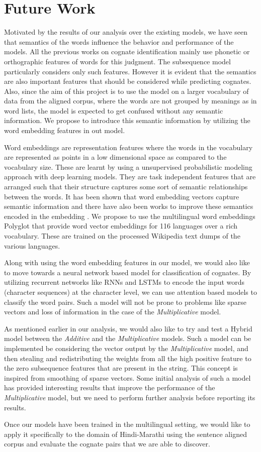 \chapter{Future Work}

Motivated by the results of our analysis over the existing models, we have seen that semantics of the words influence the behavior and performance of the models. All the previous works on cognate identification mainly use phonetic or orthographic features of words for this judgment. The subsequence model particularly considers only such features. However it is evident that the semantics are also important features that should be considered while predicting cognates. Also, since the aim of this project is to use the model on a larger vocabulary of data from the aligned corpus, where the words are not grouped by meanings as in word lists, the model is expected to get confused without any semantic information. We propose to introduce this semantic information by utilizing the word embedding features in out model. 

Word embeddings are representation features where the words in the vocabulary are represented as points in a low dimensional space as compared to the vocabulary size. These are learnt by using a unsupervised probabilistic modeling approach with deep learning models. They are task independent features that are arranged such that their structure captures some sort of semantic relationships between the words. It has been shown that word embedding vectors capture semantic information \cite{faruqui2014retrofitting} and there have also been works to improve these semantics encoded in the embedding \cite{maas2010probabilistic}. We propose to use the multilingual word embeddings Polyglot \cite{polyglot:2013:ACL-CoNLL} that provide word vector embeddings for 116 languages over a rich vocabulary. These are trained on the processed Wikipedia text dumps of the various languages. 

Along with using the word embedding features in our model, we would also like to move towards a neural network based model for classification of cognates. By utilizing recurrent networks like RNNs and LSTMs to encode the input words (character sequences) at the character level, we can use attention based models to classify the word pairs. Such a model will not be prone to problems like sparse vectors and loss of information in the case of the \textit{Multiplicative} model.

As mentioned earlier in our analysis, we would also like to try and test a Hybrid model  between the \textit{Additive} and the \textit{Multiplicative} models. Such a model can be implemented be considering the vector output by the \textit{Multiplicative} model, and then stealing and redistributing the weights from all the high positive feature to the zero subsequence features that are present in the string. This concept is inspired from smoothing of sparse vectors. Some initial analysis of such a model has provided interesting results that improve the performance of the \textit{Multiplicative} model, but we need to perform further analysis before reporting its results.

Once our models have been trained in the multilingual setting, we would like to apply it specifically to the domain of Hindi-Marathi using the sentence aligned corpus and evaluate the cognate pairs that we are able to discover. 

